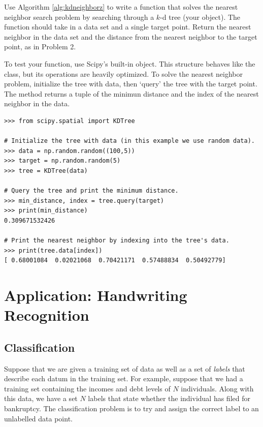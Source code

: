 \begin{problem}
Use Algorithm \ref{alg:kdneighborz} to write a function that solves the nearest neighbor search problem by searching through a $k$-d tree (your  object).
The function should take in a data set and a single target point.
Return the nearest neighbor in the data set and the distance from the nearest neighbor to the target point, as in Problem 2.

To test your function, use Scipy's built-in  object.
This structure behaves like the  class, but its operations are heavily optimized.
To solve the nearest neighbor problem, initialize the tree with data, then `query' the tree with the target point.
The  method returns a tuple of the minimun distance and the index of the nearest neighbor in the data.

\begin{lstlisting}
>>> from scipy.spatial import KDTree

# Initialize the tree with data (in this example we use random data).
>>> data = np.random.random((100,5))
>>> target = np.random.random(5)
>>> tree = KDTree(data)

# Query the tree and print the minimum distance.
>>> min_distance, index = tree.query(target)
>>> print(min_distance)
0.309671532426

# Print the nearest neighbor by indexing into the tree's data.
>>> print(tree.data[index])
[ 0.68001084  0.02021068  0.70421171  0.57488834  0.50492779]
\end{lstlisting}
\end{problem}

\section*{Application: Handwriting Recognition}

\subsection*{Classification}

Suppose that we are given a training set of data as well as a set of \emph{labels} that describe each datum in the training set.
For example, suppose that we had a training set containing the incomes and debt levels of $N$ individuals.
Along with this data, we have a set $N$ labels that state whether the individual has filed for bankruptcy.
The classification problem is to try and assign the correct label to an unlabelled data point.

